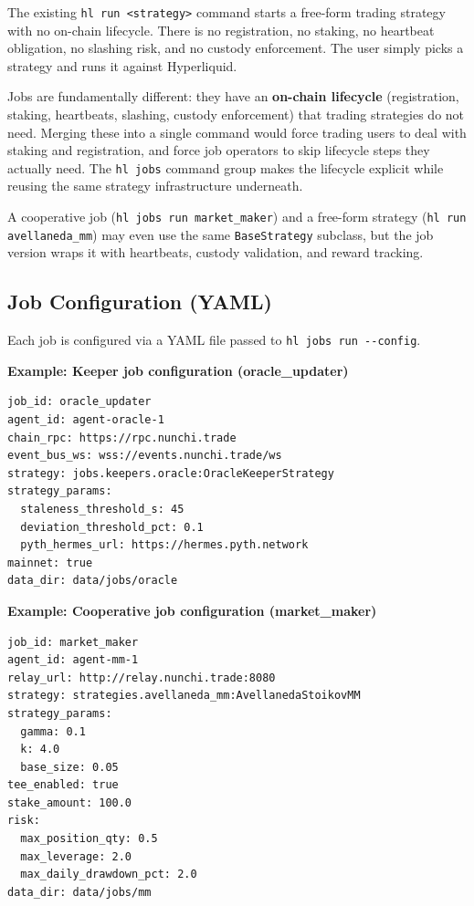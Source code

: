 \documentclass[11pt,a4paper]{article}
\begin{document}
\begin{designbox}
The existing \texttt{hl run <strategy>} command starts a free-form trading strategy
with no on-chain lifecycle. There is no registration, no staking, no heartbeat
obligation, no slashing risk, and no custody enforcement. The user simply picks a
strategy and runs it against Hyperliquid.

Jobs are fundamentally different: they have an \textbf{on-chain lifecycle}
(registration, staking, heartbeats, slashing, custody enforcement) that trading
strategies do not need. Merging these into a single command would force trading
users to deal with staking and registration, and force job operators to skip
lifecycle steps they actually need. The \texttt{hl jobs} command group makes
the lifecycle explicit while reusing the same strategy infrastructure underneath.

A cooperative job (\texttt{hl jobs run market\_maker}) and a free-form strategy
(\texttt{hl run avellaneda\_mm}) may even use the same \texttt{BaseStrategy}
subclass, but the job version wraps it with heartbeats, custody validation, and
reward tracking.
\end{designbox}

\subsection{Job Configuration (YAML)}

Each job is configured via a YAML file passed to \texttt{hl jobs run -{}-config}.

\begin{keeperbox}
\textbf{Example: Keeper job configuration (oracle\_updater)}
\begin{lstlisting}[language={}]
job_id: oracle_updater
agent_id: agent-oracle-1
chain_rpc: https://rpc.nunchi.trade
event_bus_ws: wss://events.nunchi.trade/ws
strategy: jobs.keepers.oracle:OracleKeeperStrategy
strategy_params:
  staleness_threshold_s: 45
  deviation_threshold_pct: 0.1
  pyth_hermes_url: https://hermes.pyth.network
mainnet: true
data_dir: data/jobs/oracle
\end{lstlisting}
\end{keeperbox}

\begin{cooperativebox}
\textbf{Example: Cooperative job configuration (market\_maker)}
\begin{lstlisting}[language={}]
job_id: market_maker
agent_id: agent-mm-1
relay_url: http://relay.nunchi.trade:8080
strategy: strategies.avellaneda_mm:AvellanedaStoikovMM
strategy_params:
  gamma: 0.1
  k: 4.0
  base_size: 0.05
tee_enabled: true
stake_amount: 100.0
risk:
  max_position_qty: 0.5
  max_leverage: 2.0
  max_daily_drawdown_pct: 2.0
data_dir: data/jobs/mm
\end{lstlisting}
\end{cooperativebox}
\end{document}
